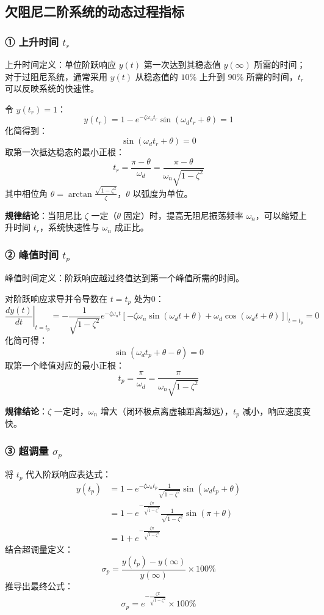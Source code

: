\subsection{欠阻尼二阶系统的动态过程指标}
\subsubsection{① 上升时间 $t_r$}
上升时间定义：单位阶跃响应 $y(t)$ 第一次达到其稳态值 $y(\infty)$ 所需的时间；对于过阻尼系统，通常采用 $y(t)$ 从稳态值的 $10\%$ 上升到 $90\%$ 所需的时间，$t_r$ 可以反映系统的快速性。

令 $y(t_r)=1$：
\[
y(t_r) = 1 - e^{-\zeta\omega_n t_r}\sin(\omega_d t_r+\theta) = 1
\]
化简得到：
\[
\sin(\omega_d t_r+\theta)=0
\]
取第一次抵达稳态的最小正根：
\[
t_r = \frac{\pi-\theta}{\omega_d} = \frac{\pi-\theta}{\omega_n\sqrt{1-\zeta^2}}
\]
其中相位角 $\displaystyle\theta = \arctan\frac{\sqrt{1-\zeta^2}}{\zeta}$，$\theta$ 以弧度为单位。

\textbf{规律结论}：当阻尼比 $\zeta$ 一定（$\theta$ 固定）时，提高无阻尼振荡频率 $\omega_n$，可以缩短上升时间 $t_r$，系统快速性与 $\omega_n$ 成正比。

\subsubsection{② 峰值时间 $t_p$}
峰值时间定义：阶跃响应越过终值达到第一个峰值所需的时间。

对阶跃响应求导并令导数在 $t=t_p$ 处为0：
\[
\left.\frac{dy(t)}{dt}\right|_{t=t_p} = -\frac{1}{\sqrt{1-\zeta^2}}e^{-\zeta\omega_n t}\left[-\zeta\omega_n\sin(\omega_d t+\theta)+\omega_d\cos(\omega_d t+\theta)\right]\bigg|_{t=t_p}=0
\]
化简可得：
\[
\sin(\omega_d t_p+\theta-\theta)=0
\]
取第一个峰值对应的最小正根：
\[
t_p=\frac{\pi}{\omega_d}=\frac{\pi}{\omega_n\sqrt{1-\zeta^2}}
\]

\textbf{规律结论}：$\zeta$ 一定时，$\omega_n$ 增大（闭环极点离虚轴距离越远），$t_p$ 减小，响应速度变快。

\subsubsection{③ 超调量 $\sigma_p$}
将 $t_p$ 代入阶跃响应表达式：
\[
\begin{aligned}
y(t_p) &= 1-e^{-\zeta\omega_n t_p}\frac{1}{\sqrt{1-\zeta^2}}\sin(\omega_d t_p+\theta) \\
&=1-e^{-\frac{\zeta\pi}{\sqrt{1-\zeta^2}}}\frac{1}{\sqrt{1-\zeta^2}}\sin(\pi+\theta) \\
&=1+e^{-\frac{\zeta\pi}{\sqrt{1-\zeta^2}}}
\end{aligned}
\]
结合超调量定义：
\[
\sigma_p = \frac{y(t_p)-y(\infty)}{y(\infty)}\times 100\%
\]
推导出最终公式：
\[
\sigma_p = e^{-\frac{\zeta\pi}{\sqrt{1-\zeta^2}}}\times 100\%
\]

